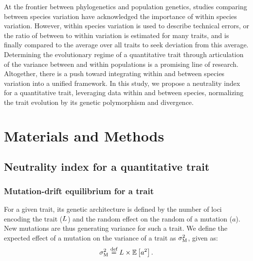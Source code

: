 \documentclass{article}
\begin{document}
At the frontier between phylogenetics and population genetics, studies comparing between species variation have acknowledged the importance of within species variation\cite{whitehead_variation_2006, fay_evaluating_2008}.
However, within species variation is used to describe technical errors, or the ratio of between to within variation is estimated for many traits, and is finally compared to the average over all traits to seek deviation from this average\cite{rohlfs_modeling_2014, rohlfs_phylogenetic_2015}.
Determining the evolutionary regime of a quantitative trait through articulation of the variance between and within populations is a promising line of research\cite{kostikova_bridging_2016, gaboriau_multiplatform_2020}.
Altogether, there is a push toward integrating within and between species variation into a unified framework.
In this study, we propose a neutrality index for a quantitative trait, leveraging data within and between species, normalizing the trait evolution by its genetic polymorphism and divergence.

\section{Materials and Methods}\label{sec:materials-and-methods}
\subsection{Neutrality index for a quantitative trait}\label{subsec:neutrality-index-for-a-quantitative-trait}
\subsubsection{Mutation-drift equilibrium for a trait}

For a given trait, its genetic architecture is defined by the number of loci encoding the trait ($L$) and the random effect on the random of a mutation ($a$).
New mutations are thus generating variance for such a trait.
We define the expected effect of a mutation on the variance of a trait as $\sigma^2_{\text{M}}$, given as:
\begin{gather}
    \sigma^2_{\text{M}} \stackrel{\text{def}}{=} L \times \operatorname{\mathbb{E}} \left[ a^2 \right]. \label{eq:rate-mut}
\end{gather}
\end{document}
